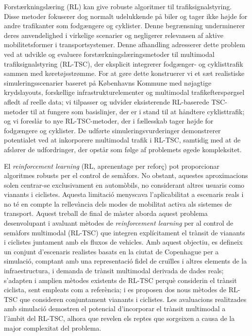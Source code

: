\vspace{2cm}
\newpage
{}

\vspace{1cm}

Forstærkningslæring (RL) kan give robuste algoritmer til trafiksignalstyring. Disse metoder fokuserer dog normalt udelukkende på biler og tager ikke højde for andre trafikanter som fodgængere og cyklister. Denne begrænsning underminerer deres anvendelighed i virkelige scenarier og negligerer relevansen af aktive mobilitetsformer i transportsystemer. Denne afhandling adresserer dette problem ved at udvikle og evaluere forstærkningslæringsmetoder til multimodal trafiksignalstyring (RL-TSC), der eksplicit integrerer fodgænger- og cyklisttrafik sammen med køretøjsstrømme. For at gøre dette konstruerer vi et sæt realistiske simuleringsscenarier baseret på Københavns Kommune med nøjagtige krydslayouts, forskellige infrastrukturelementer og multimodal trafikefterspørgsel afledt af reelle data; vi tilpasser og udvider eksisterende RL-baserede TSC-metoder til at fungere som basislinjer, der er i stand til at håndtere cyklisttrafik; og vi foreslår to nye RL-TSC-metoder, der i fællesskab tager højde for fodgængere og cyklister. De udførte simuleringsvurderinger demonstrerer potentialet ved at inkorporere multimodal trafik i RL-TSC, samtidig med at de afslører de udfordringer, der opstår som følge af problemets øgede kompleksitet.

\vspace{2cm}


\vspace{1cm}

El \textit{reinforcement learning} (RL, aprenentage per reforç) pot proporcionar algoritmes robusts per el control de semàfors. No obstant, aquestes aproximacions solen centrar-se exclusivament en automòbils, no considerant altres usuaris como vianants i ciclistes. Aquesta limitació menyscava l'aplicabilitat a escenaris reals i no té en compte la rellevància dels modes de mobilitat activa als sistemes de transport. Aquest treball de final de màster aborda aquest problema desenvolupant i avaluant mètodes de \textit{reinforcement learning} per al control de semàfors multimodal (RL-TSC) que integren explícitament el trànsit de vianants i ciclistes juntament amb els fluxos de vehicles. Amb aquest objectiu, es defineix un conjunt d'escenaris realistes basats en la ciutat de Copenhague per a simulació, comptant amb una representació fidel de cruïlles i altres elements de la infraestructura, i demanda de trànsit multimodal derivada de dades reals; s'adapten i amplien mètodes existents de RL-TSC perquè considerin el trànsit ciclista, sent empleats com a referència; i es proposen dos nous mètodes de RL-TSC que consideren conjuntament vianants i ciclistes. Les avaluacions realitzades amb simulació demostren el potencial d'incorporar el trànsit multimodal a l'àmbit del RL-TSC, alhora que revelen els reptes que sorgeixen a causa de la major complexitat del problema.

\clearpage
